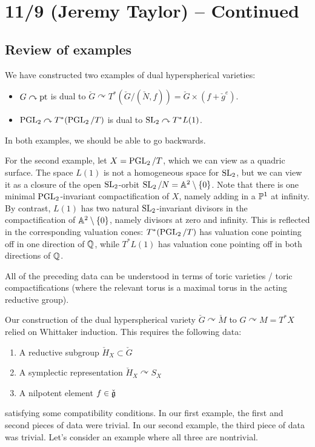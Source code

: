 \documentclass{article}
\begin{document}
\section{11/9 (Jeremy Taylor) -- Continued}

\subsection{Review of examples}

We have constructed two examples of dual hyperspherical varieties:
\begin{itemize}
	\item $G \curvearrowright \pt$ is dual to $\check{G} \curvearrowright T^*(\check{G} / (\check{N},f)) = \check{G} \times (f + \check{g}^e)$.
	\item $\PGL_2 \curvearrowright T^*(\PGL_2 / T)$ is dual to $\SL_2 \curvearrowright T^* L(1)$.
\end{itemize}
In both examples, we should be able to go backwards.

For the second example, let $X = \PGL_2 / T$, which we can view as a quadric surface.
The space $L(1)$ is not a homogeneous space for $\SL_2$, but we can view it as a closure of the open $\SL_2$-orbit $\SL_2 / N = \AA^2 \setminus \{0\}$.
Note that there is one minimal $\PGL_2$-invariant compactification of $X$, namely adding in a $\PP^1$ at infinity.
By contrast, $L(1)$ has two natural $\SL_2$-invariant divisors in the compactification of $\AA^2 \setminus \{0\}$, namely divisors at zero and infinity.
This is reflected in the corresponding valuation cones: $T^*(\PGL_2 / T)$ has valuation cone pointing off in one direction of $\QQ$, while $T^* L(1)$ has valuation cone pointing off in both directions of $\QQ$.

All of the preceding data can be understood in terms of toric varieties / toric compactifications (where the relevant torus is a maximal torus in the acting reductive group).

Our construction of the dual hyperspherical variety $\check{G} \curvearrowright \check{M}$ to $G \curvearrowright M = T^*X$ relied on Whittaker induction.
This requires the following data:
\begin{enumerate}
	\item A reductive subgroup $\check{H}_X \subset \check{G}$
	\item A symplectic representation $\check{H}_X \curvearrowright S_X$
	\item A nilpotent element $f \in \check{\gf}$
\end{enumerate}
satisfying some compatibility conditions.
In our first example, the first and second pieces of data were trivial.
In our second example, the third piece of data was trivial.
Let's consider an example where all three are nontrivial.
\end{document}

